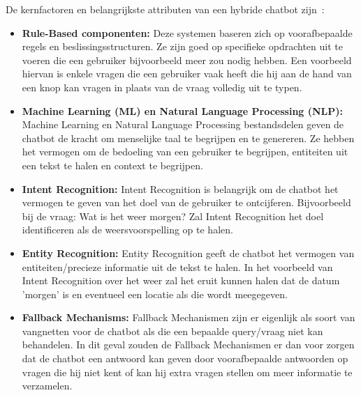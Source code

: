 De kernfactoren en belangrijkste attributen van een hybride chatbot zijn~\autocite{Team2023}:

\begin{itemize}
    \item \textbf{Rule-Based componenten:} Deze systemen baseren zich op voorafbepaalde regels en beslissingsstructuren. Ze zijn goed op specifieke opdrachten uit te voeren die een gebruiker bijvoorbeeld meer zou nodig hebben. Een voorbeeld hiervan is enkele vragen die een gebruiker vaak heeft die hij aan de hand van een knop kan vragen in plaats van de vraag volledig uit te typen. 
    \item \textbf{Machine Learning (ML) en Natural Language Processing (NLP):} Machine Learning en Natural Language Processing bestandsdelen geven de chatbot de kracht om menselijke taal te begrijpen en te genereren. Ze hebben het vermogen om de bedoeling van een gebruiker te begrijpen, entiteiten uit een tekst te halen en context te begrijpen. 
    \item \textbf{Intent Recognition:} Intent Recognition is belangrijk om de chatbot het vermogen te geven van het doel van de gebruiker te ontcijferen. Bijvoorbeeld bij de vraag: Wat is het weer morgen? Zal Intent Recognition het doel identificeren als de weersvoorspelling op te halen. 
    \item \textbf{Entity Recognition:} Entity Recognition geeft de chatbot het vermogen van entiteiten/precieze informatie uit de tekst te halen. In het voorbeeld van Intent Recognition over het weer zal het eruit kunnen halen dat de datum 'morgen' is en eventueel een locatie als die wordt meegegeven. 
    \item \textbf{Fallback Mechanisms:} Fallback Mechanismen zijn er eigenlijk als soort van vangnetten voor de chatbot als die een bepaalde query/vraag niet kan behandelen. In dit geval zouden de Fallback Mechanismen er dan voor zorgen dat de chatbot een antwoord kan geven door voorafbepaalde antwoorden op vragen die hij niet kent of kan hij extra vragen stellen om meer informatie te verzamelen. 
\end{itemize}


